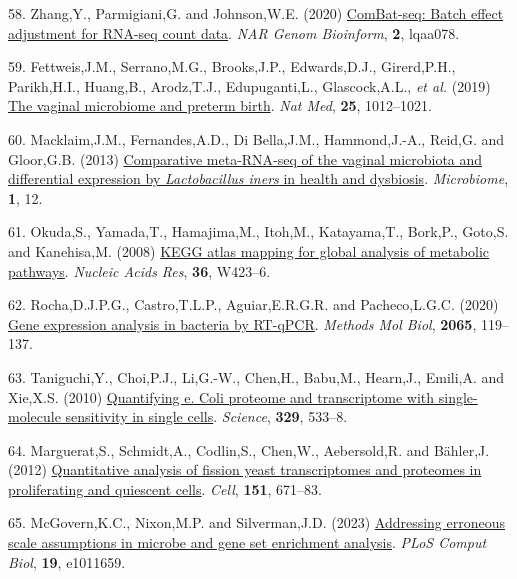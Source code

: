 \documentclass[
]{article}
\newlength{\cslhangindent}
\newenvironment{CSLReferences}[2] %
 {\begin{list}{}{%
  \setlength{\itemindent}{0pt}
  \setlength{\leftmargin}{0pt}
  \setlength{\parsep}{0pt}
  \ifodd #1
   \setlength{\leftmargin}{\cslhangindent}
   \setlength{\itemindent}{-1\cslhangindent}
  \fi
  \setlength{\itemsep}{#2\baselineskip}}}
 {\end{list}}
\begin{document}
\begin{CSLReferences}{1}{1}
58. Zhang,Y., Parmigiani,G. and Johnson,W.E. (2020)
\href{https://doi.org/10.1093/nargab/lqaa078}{ComBat-seq: Batch effect
adjustment for RNA-seq count data}. \emph{NAR Genom Bioinform},
\textbf{2}, lqaa078.

59. Fettweis,J.M., Serrano,M.G., Brooks,J.P., Edwards,D.J., Girerd,P.H.,
Parikh,H.I., Huang,B., Arodz,T.J., Edupuganti,L., Glascock,A.L.,
\emph{et al.} (2019)
\href{https://doi.org/10.1038/s41591-019-0450-2}{The vaginal microbiome
and preterm birth}. \emph{Nat Med}, \textbf{25}, 1012--1021.

60. Macklaim,J.M., Fernandes,A.D., Di Bella,J.M., Hammond,J.-A., Reid,G.
and Gloor,G.B. (2013)
\href{https://doi.org/10.1186/2049-2618-1-12}{Comparative meta-{RNA}-seq
of the vaginal microbiota and differential expression by
\emph{{L}actobacillus iners} in health and dysbiosis}.
\emph{Microbiome}, \textbf{1}, 12.

61. Okuda,S., Yamada,T., Hamajima,M., Itoh,M., Katayama,T., Bork,P.,
Goto,S. and Kanehisa,M. (2008)
\href{https://doi.org/10.1093/nar/gkn282}{KEGG atlas mapping for global
analysis of metabolic pathways}. \emph{Nucleic Acids Res}, \textbf{36},
W423--6.

62. Rocha,D.J.P.G., Castro,T.L.P., Aguiar,E.R.G.R. and Pacheco,L.G.C.
(2020) \href{https://doi.org/10.1007/978-1-4939-9833-3_10}{Gene
expression analysis in bacteria by RT-qPCR}. \emph{Methods Mol Biol},
\textbf{2065}, 119--137.

63. Taniguchi,Y., Choi,P.J., Li,G.-W., Chen,H., Babu,M., Hearn,J.,
Emili,A. and Xie,X.S. (2010)
\href{https://doi.org/10.1126/science.1188308}{Quantifying e. Coli
proteome and transcriptome with single-molecule sensitivity in single
cells}. \emph{Science}, \textbf{329}, 533--8.

64. Marguerat,S., Schmidt,A., Codlin,S., Chen,W., Aebersold,R. and
Bähler,J. (2012)
\href{https://doi.org/10.1016/j.cell.2012.09.019}{Quantitative analysis
of fission yeast transcriptomes and proteomes in proliferating and
quiescent cells}. \emph{Cell}, \textbf{151}, 671--83.

65. McGovern,K.C., Nixon,M.P. and Silverman,J.D. (2023)
\href{https://doi.org/10.1371/journal.pcbi.1011659}{Addressing erroneous
scale assumptions in microbe and gene set enrichment analysis}.
\emph{PLoS Comput Biol}, \textbf{19}, e1011659.


\end{CSLReferences}
\end{document}
